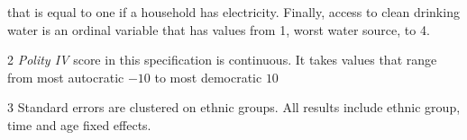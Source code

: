 \begin{table}[!h]
{\begin{threeparttable}
\begin{tablenotes}
{                      that is equal to one if a household has electricity. Finally, access to clean 
                      drinking water is an ordinal variable that has values from 1, worst water source, to 4.}
\item[2] \footnotesize{\textit{Polity IV } score in this specification is continuous. It takes
                      values that range from most autocratic $-10$ to most democratic $10$}
\item[3] \footnotesize{Standard errors are clustered on ethnic groups. All 
                      results include ethnic group, time and age fixed effects.}
\end{tablenotes}
\end{threeparttable}}
\end{table}
